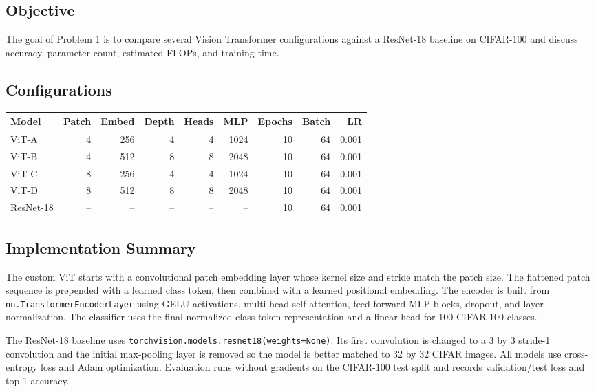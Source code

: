 \documentclass[11pt]{article}
\begin{document}
\subsection*{Objective}
The goal of Problem 1 is to compare several Vision Transformer configurations against a ResNet-18 baseline on CIFAR-100 and discuss accuracy, parameter count, estimated FLOPs, and training time.

\subsection*{Configurations}
\begin{center}
\scriptsize
\begin{tabular}{|p{0.85in}|r|r|r|r|r|r|r|r|}
\hline
Model & Patch & Embed & Depth & Heads & MLP & Epochs & Batch & LR \\
\hline
ViT-A & 4 & 256 & 4 & 4 & 1024 & 10 & 64 & 0.001 \\
\hline
ViT-B & 4 & 512 & 8 & 8 & 2048 & 10 & 64 & 0.001 \\
\hline
ViT-C & 8 & 256 & 4 & 4 & 1024 & 10 & 64 & 0.001 \\
\hline
ViT-D & 8 & 512 & 8 & 8 & 2048 & 10 & 64 & 0.001 \\
\hline
ResNet-18 & -- & -- & -- & -- & -- & 10 & 64 & 0.001 \\
\hline
\end{tabular}
\end{center}

\subsection*{Implementation Summary}
The custom ViT starts with a convolutional patch embedding layer whose kernel size and stride match the patch size. The flattened patch sequence is prepended with a learned class token, then combined with a learned positional embedding. The encoder is built from \texttt{nn.TransformerEncoderLayer} using GELU activations, multi-head self-attention, feed-forward MLP blocks, dropout, and layer normalization. The classifier uses the final normalized class-token representation and a linear head for 100 CIFAR-100 classes.

The ResNet-18 baseline uses \texttt{torchvision.models.resnet18(weights=None)}. Its first convolution is changed to a 3 by 3 stride-1 convolution and the initial max-pooling layer is removed so the model is better matched to 32 by 32 CIFAR images. All models use cross-entropy loss and Adam optimization. Evaluation runs without gradients on the CIFAR-100 test split and records validation/test loss and top-1 accuracy.
\end{document}
